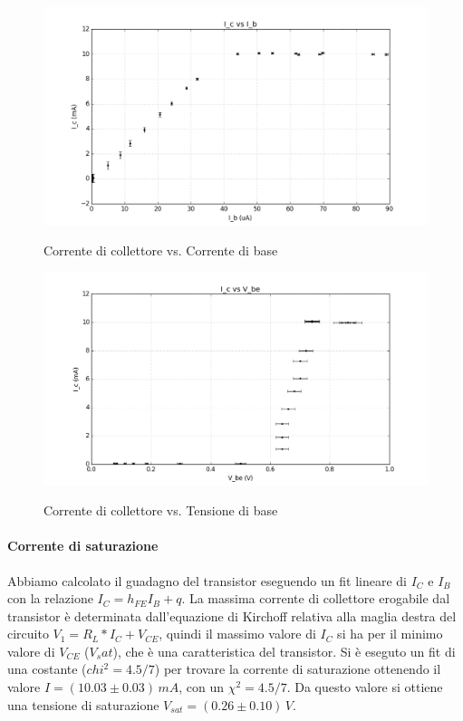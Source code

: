 \documentclass[10pt,a4paper]{article}
\begin{document}
\begin{figure}[!htb]
  \centering
  \includegraphics[scale=0.4]{IcIb.png} \label{IcIb}
\caption{Corrente di collettore vs. Corrente di base}
\label{circuito}
\end{figure}

\begin{figure}[!htb]
  \centering
  \includegraphics[scale=0.4]{IcVbe.png} \label{IcVbe}
\caption{Corrente di collettore vs. Tensione di base}
\label{circuito}
\end{figure}


\paragraph{Corrente di saturazione}
Abbiamo calcolato il guadagno del transistor eseguendo un fit lineare di $I_C$ e $I_B$ con la  relazione $I_C=h_{FE}I_B+q$.
La massima corrente di collettore erogabile dal transistor è determinata dall'equazione di Kirchoff relativa alla maglia destra del circuito  $V_1 = R_L*I_C + V_{CE}$, quindi il massimo valore di $I_C$ si ha per il minimo valore di $V_{CE}$ ($V_sat$), che è una caratteristica del transistor.
Si è eseguto un fit di una costante ($chi^2 = 4.5/7$) per trovare la corrente di saturazione ottenendo il valore $I = (10.03 \pm 0.03) \, mA$, con un $\chi^2 = 4.5/7$. Da questo valore si ottiene una tensione di saturazione $V_{sat} = (0.26 \pm 0.10) \, V$.
\end{document}
